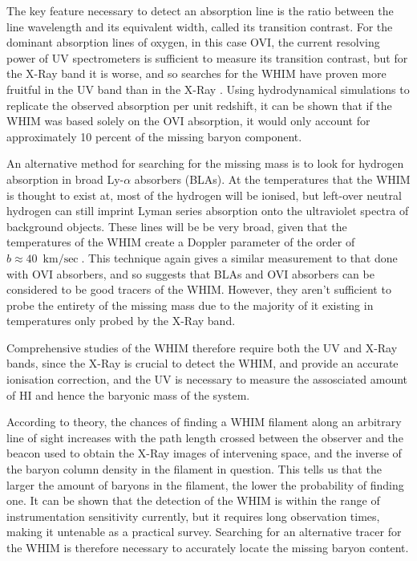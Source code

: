\par The key feature necessary to detect an absorption line is the ratio between the line wavelength and its equivalent width, called its transition contrast. For the dominant absorption lines of oxygen, in this case OVI, the current resolving power of UV spectrometers is sufficient to measure its transition contrast, but for the X-Ray band it is worse, and so searches for the WHIM have proven more fruitful in the UV band than in the X-Ray \citep{2005ApJ...624..555D,2006A&A...445..827R}. Using hydrodynamical simulations to replicate the observed absorption per unit redshift, it can be shown that if the WHIM was based solely on the OVI absorption, it would only account for approximately 10 percent of the missing baryon component. 

\par An alternative method for searching for the missing mass is to look for hydrogen absorption in broad Ly-$\alpha$ absorbers (BLAs). At the temperatures that the WHIM is thought to exist at, most of the hydrogen will be ionised, but left-over neutral hydrogen can still imprint Lyman series absorption onto the ultraviolet spectra of background objects. These lines will be be very broad, given that the temperatures of the WHIM create a Doppler parameter of the order of $b\approx \SI{40}{\kilo\meter\per\sec}$. This technique again gives  a similar measurement to that done with OVI absorbers, and so suggests that BLAs and OVI absorbers can be considered to be good tracers of the WHIM. However, they aren't sufficient to probe the entirety of the missing mass due to the majority of it existing in temperatures only probed by the X-Ray band.

\par Comprehensive studies of the WHIM therefore require both the UV and X-Ray bands, since the X-Ray is crucial to detect the WHIM, and provide an accurate ionisation correction, and the UV is necessary to measure the assosciated amount of HI and hence the baryonic mass of the system. 

\par According to theory, the chances of finding a WHIM filament along an arbitrary line of sight increases with the path length crossed between the observer and the beacon used to obtain the X-Ray images of intervening space, and the inverse of the baryon column density in the filament in question. This tells us that the larger the amount of baryons in the filament, the lower the probability of finding one. It can be shown that the detection of the WHIM is within the range of instrumentation sensitivity currently, but it requires long observation times, making it untenable as a practical survey. Searching for an alternative tracer for the WHIM is therefore necessary to accurately locate the missing baryon content.


